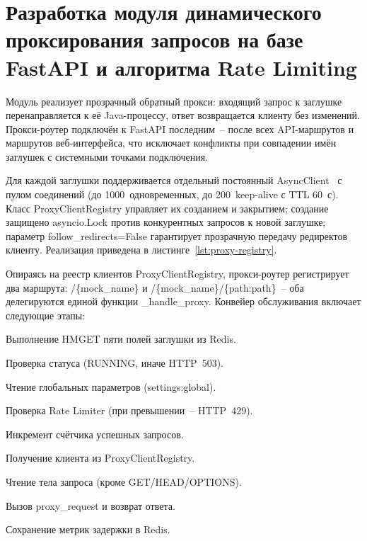
\section{Разработка модуля динамического проксирования запросов на базе FastAPI и алгоритма Rate Limiting}


Модуль реализует прозрачный обратный прокси: входящий запрос к заглушке перенаправляется к её Java-процессу, ответ возвращается клиенту без изменений. Прокси-роутер подключён к FastAPI последним~-- после всех API-маршрутов и маршрутов веб-интерфейса, что исключает конфликты при совпадении имён заглушек с системными точками подключения.

Для каждой заглушки поддерживается отдельный постоянный AsyncClient~\cite{httpx} с пулом соединений (до 1000~одновременных, до 200~keep-alive с TTL 60~с). Класс ProxyClientRegistry управляет их созданием и закрытием; создание защищено asyncio.Lock против конкурентных запросов к новой заглушке; параметр follow\_redirects=False гарантирует прозрачную передачу редиректов клиенту. Реализация приведена в листинге~\ref{lst:proxy-registry}.



Опираясь на реестр клиентов ProxyClientRegistry, прокси-роутер регистрирует два маршрута: /\{mock\_name\} и /\{mock\_name\}/\{path:path\}~-- оба делегируются единой функции \_handle\_proxy. Конвейер обслуживания включает следующие этапы:

\begin{compactlist}
\item Выполнение HMGET пяти полей заглушки из Redis.
\item Проверка статуса (RUNNING, иначе HTTP~503).
\item Чтение глобальных параметров (settings:global).
\item Проверка Rate Limiter (при превышении~-- HTTP~429).
\item Инкремент счётчика успешных запросов.
\item Получение клиента из ProxyClientRegistry.
\item Чтение тела запроса (кроме GET/HEAD/OPTIONS).
\item Вызов proxy\_request и возврат ответа.
\item Сохранение метрик задержки в Redis.
\end{compactlist}

